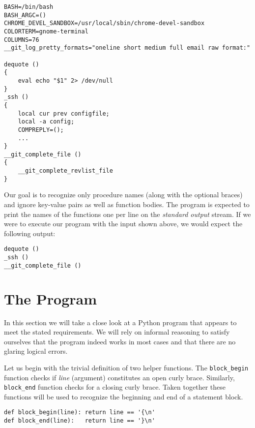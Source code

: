 \documentclass[10pt, a4paper]{article}
\begin{document}
{
\begin{lstlisting}
BASH=/bin/bash
BASH_ARGC=()
CHROME_DEVEL_SANDBOX=/usr/local/sbin/chrome-devel-sandbox
COLORTERM=gnome-terminal
COLUMNS=76
__git_log_pretty_formats="oneline short medium full email raw format:"

dequote ()
{
    eval echo "$1" 2> /dev/null
}
_ssh ()
{
    local cur prev configfile;
    local -a config;
    COMPREPLY=();
    ...
}
__git_complete_file ()
{
    __git_complete_revlist_file
}
\end{lstlisting}}

Our goal is to recognize only procedure names (along with the optional braces) and ignore key-value pairs as well as function bodies. The program is expected to print the names of the functions one per line on the \emph{standard output} stream. If we were to execute our program with the input shown above, we would expect the following output:

{
\begin{lstlisting}
dequote ()
_ssh ()
__git_complete_file ()
\end{lstlisting}}

\section{The Program}
In this section we will take a close look at a Python program that appears to meet the stated requirements. We will rely on informal reasoning to satisfy ourselves that the program indeed works in most cases and that there are no glaring logical errors.

Let us begin with the trivial definition of two helper functions. The \texttt{block\_begin} function checks if \emph{line} (argument) constitutes an open curly brace. Similarly, \texttt{block\_end} function checks for a closing curly brace. Taken together these functions will be used to recognize the beginning and end of a statement block.

\noindent\begin{lstlisting}
def block_begin(line): return line == '{\n'
def block_end(line):   return line == '}\n'
\end{lstlisting}
\end{document}
